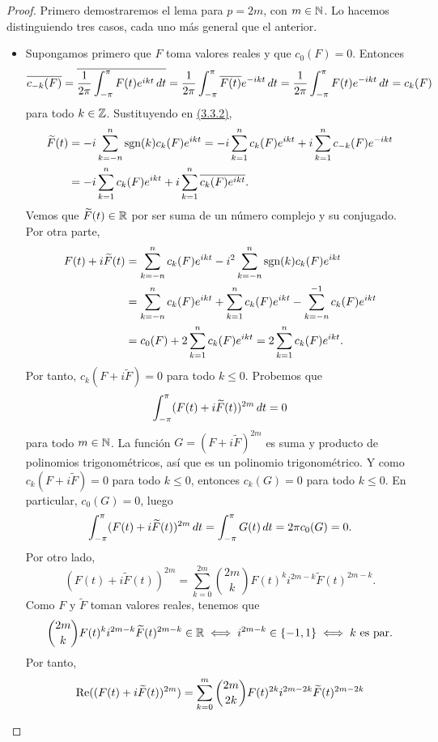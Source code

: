 \documentclass[a4paper, 12pt, oneside]{book}
\begin{document}
\begin{proof}
    Primero demostraremos el lema para $p = 2m$, con $m \in \mathbb N$. Lo hacemos distinguiendo tres casos, cada uno más general que el anterior.
    \begin{itemize}
        \item Supongamos primero que $F$ toma valores reales y que $c_0(F) = 0$. Entonces
        \[\overline{c_{-k}(F)} = \overline{\frac{1}{2\pi}\int_{-\pi}^{\pi} F(t)e^{ikt} \, dt} = \frac{1}{2\pi}\int_{-\pi}^{\pi} \overline{F(t)}e^{-ikt} \, dt =\frac{1}{2\pi}\int_{-\pi}^{\pi} {F(t)}e^{-ikt} \, dt = c_k(F)\]
        para todo $k\in\mathbb Z$. Sustituyendo en \hyperref[3.3.2]{\color{blue}(3.3.2)},
        \begin{align*}
            \widetilde{F}(t) &= -i\sum_{k=-n}^n \textup{sgn}(k)c_k(F)e^{ikt} = -i\sum_{k=1}^n c_k(F)e^{ikt}+i\sum_{k=1}^{n}c_{-k}(F)e^{-ikt} \\
            &=-i\sum_{k=1}^n c_k(F)e^{ikt}+i\sum_{k=1}^{n}\overline{c_k(F)e^{ikt}}.
        \end{align*}
        Vemos que $\widetilde{F}(t) \in \mathbb R$ por ser suma de un número complejo y su conjugado. Por otra parte,
        \begin{align*}
            F(t)+i\widetilde{F}(t) &= \sum_{k=-n}^n c_k(F)e^{ikt}-i^2\sum_{k=-n}^n \textup{sgn}(k)c_k(F)e^{ikt} \\ 
            &= \sum_{k=-n}^n c_k(F)e^{ikt}+\sum_{k=1}^n c_k(F)e^{ikt} - \sum_{k=-n}^{-1} c_k(F)e^{ikt} \\
            &=c_0(F)+2\sum_{k=1}^n c_k(F)e^{ikt} = 2\sum_{k=1}^n c_k(F)e^{ikt}.
        \end{align*}
        Por tanto, $c_k(F+i\widetilde{F}) = 0$ para todo $k \leq 0$. Probemos que
        \[\int_{-\pi}^{\pi} (F(t)+i\widetilde{F}(t))^{2m} \, dt = 0\]
        para todo $m \in \mathbb N$. La función $G = (F+i\widetilde{F})^{2m}$ es suma y producto de polinomios trigonométricos, así que es un polinomio trigonométrico. Y como $c_k(F+i\widetilde{F}) = 0$ para todo $k \leq 0$, entonces $c_k(G) = 0$ para todo $k \leq 0$. En particular, $c_0(G) = 0$, luego
        \[ \int_{-\pi}^{\pi} (F(t)+i\widetilde{F}(t))^{2m} \, dt = \int_{-\pi}^{\pi} G(t) \, dt = 2\pi c_0(G) = 0.\]
        Por otro lado,
        \[(F(t)+i\widetilde{F}(t))^{2m} = \sum_{k=0}^{2m}\binom{2m}{k}F(t)^ki^{2m-k}\widetilde{F}(t)^{2m-k}.\]Como $F$ y $\widetilde{F}$ toman valores reales, tenemos que
        \[\binom{2m}{k}F(t)^ki^{2m-k}\widetilde{F}(t)^{2m-k} \in \mathbb R \iff i^{2m-k} \in \{-1,1\} \iff k \textup{ es par}.\]
        Por tanto,
        \begin{align*}
            \real((F(t)+i\widetilde{F}(t))^{2m}) &= \sum_{k=0}^{m} \binom{2m}{2k}F(t)^{2k}i^{2m-2k}\widetilde{F}(t)^{2m-2k} \\

\end{align*}
\end{itemize}
\end{proof}
\end{document}
